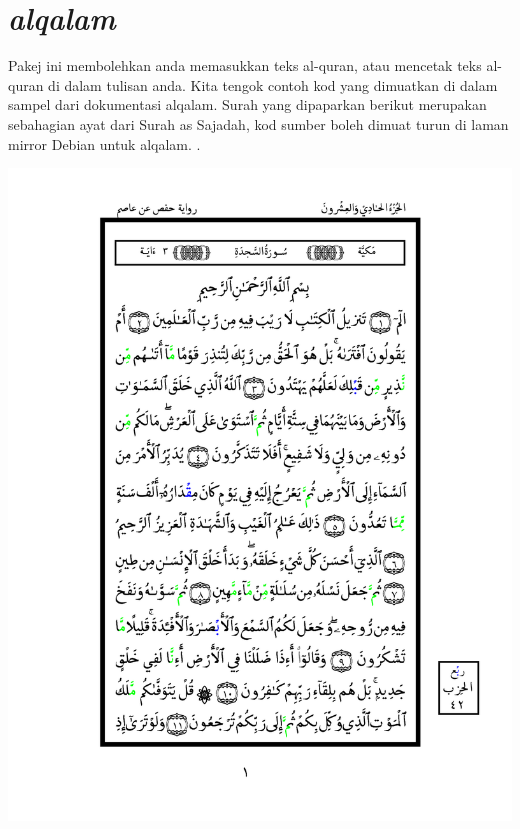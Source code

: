 \section{\emph{alqalam}}
Pakej ini membolehkan anda memasukkan teks al-quran, atau mencetak teks al-quran di dalam tulisan anda.
Kita tengok contoh kod yang dimuatkan di dalam sampel dari dokumentasi alqalam. Surah yang dipaparkan berikut merupakan sebahagian ayat dari
Surah as Sajadah, kod sumber \latex{} boleh dimuat turun di laman mirror Debian untuk alqalam. \cite{paut-kalam}.
%

%


\begin{minipage}{\linewidth}
\begin{center}

\includegraphics[scale=0.6]{sajdah_1.png}
\end{center}
\end{minipage}



